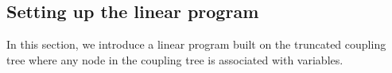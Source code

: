 \documentclass[11pt]{article}
\newcommand{\set}[1]{\left\{#1\right\}}
\newcommand{\vecf}{\boldsymbol{f}}
\renewcommand{\Pr}[2][]{ \ifthenelse{\isempty{#1}}
  {\mathbf{Pr}\left[#2\right]} {\mathbf{Pr}_{#1}\left[#2\right]} }
\newcommand{\hktodo}[1]{{\color{blue}{#1}}}
\begin{document}

\subsection{Setting up the linear program}

In this section, we introduce a linear program built on the truncated coupling tree where any node in the coupling tree is associated with variables.

\hktodo{check whether the set of variables is correct}
\end{document}
